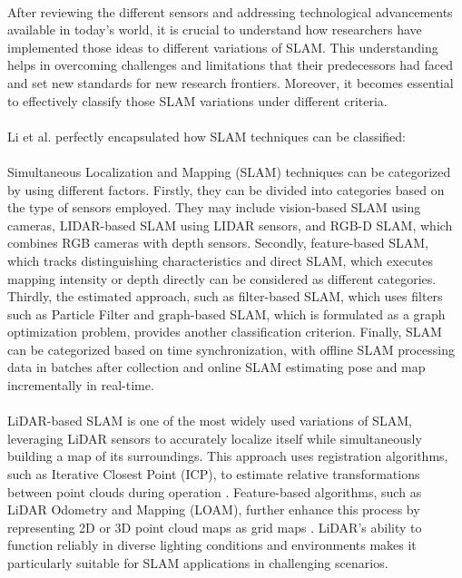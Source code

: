 \paragraph*{}
After reviewing the different sensors and addressing technological advancements available in today’s world, it is crucial to understand how researchers have implemented those ideas to different variations of SLAM. This understanding helps in overcoming challenges and limitations that their predecessors had faced and set new standards for new research frontiers. Moreover, it becomes essential to effectively classify those SLAM variations under different criteria.

\paragraph*{}
Li et al.\cite{li2024object} perfectly encapsulated how SLAM techniques can be classified: 

\paragraph*{}
Simultaneous Localization and Mapping (SLAM) techniques can be categorized by using different factors. Firstly, they can be divided into categories based on the type of sensors employed. They may include vision-based SLAM using cameras, LIDAR-based SLAM using LIDAR sensors, and RGB-D SLAM, which combines RGB cameras with depth sensors. Secondly, feature-based SLAM, which tracks distinguishing characteristics and direct SLAM, which executes mapping intensity or depth directly can be considered as different categories. Thirdly, the estimated approach, such as filter-based SLAM, which uses filters such as Particle Filter and graph-based SLAM, which is formulated as a graph optimization problem, provides another classification criterion. Finally, SLAM can be categorized based on time synchronization, with offline SLAM processing data in batches after collection and online SLAM estimating pose and map incrementally in real-time.

\paragraph*{} 
LiDAR-based SLAM is one of the most widely used variations of SLAM, leveraging LiDAR sensors to accurately localize itself while simultaneously building a map of its surroundings. This approach uses registration algorithms, such as Iterative Closest Point (ICP), to estimate relative transformations between point clouds during operation \cite{gu2020review}. Feature-based algorithms, such as LiDAR Odometry and Mapping (LOAM), further enhance this process by representing 2D or 3D point cloud maps as grid maps \cite{zhang2014loam}. LiDAR’s ability to function reliably in diverse lighting conditions and environments makes it particularly suitable for SLAM applications in challenging scenarios.


